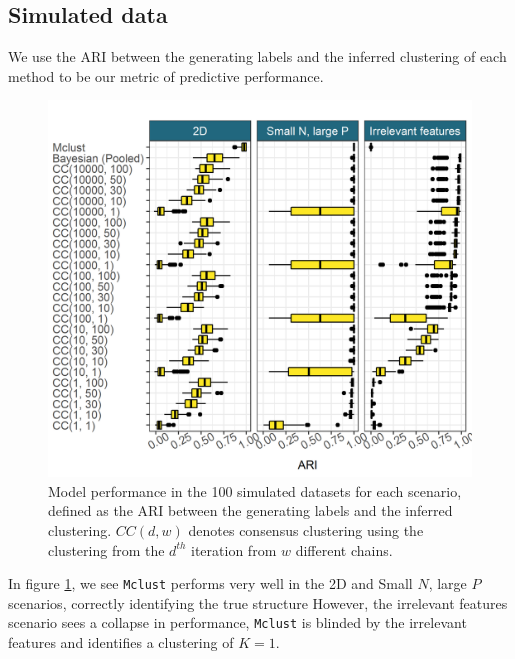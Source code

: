 \documentclass{bmcart}
\begin{document}
\subsection*{Simulated data}
We use the ARI between the generating labels and the inferred clustering of each method to be our metric of predictive performance.
\begin{figure} %
    \centering
    \includegraphics[scale=0.75]{./Images/Simulations/simulation_model_prediction.png}
    \caption{Model performance in the 100 simulated datasets for each scenario, defined as the ARI between the generating labels and the inferred clustering. $CC(d, w)$ denotes consensus clustering using the clustering from the $d^{th}$ iteration from $w$ different chains. }
    \label{fig:simResults}
\end{figure}
In figure \ref{fig:simResults}, we see \texttt{Mclust} performs very well in the 2D and Small $N$, large $P$ scenarios, correctly identifying the true structure However, the irrelevant features scenario sees a collapse in performance,
\texttt{Mclust} is blinded by the irrelevant features and identifies a clustering of $K=1$. 
\end{document}
